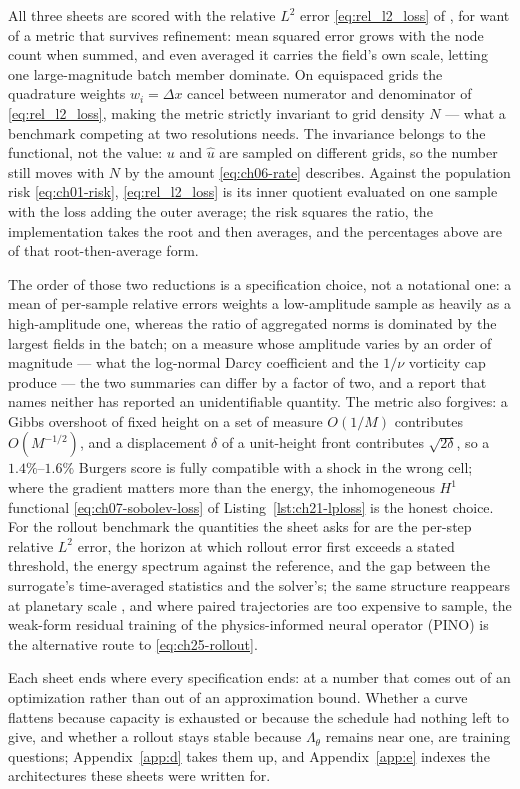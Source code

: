 All three sheets are scored with the relative $L^{2}$ error \eqref{eq:rel_l2_loss} of
, for want of a metric that
survives refinement: mean squared error grows with the node count when summed, and even
averaged it carries the field's own scale, letting one large-magnitude batch member
dominate. On equispaced grids the quadrature weights $w_i = \Delta x$ cancel
between numerator and denominator of \eqref{eq:rel_l2_loss}, making the metric strictly
invariant to grid density $N$ --- what a benchmark competing at two resolutions needs. The
invariance belongs to the functional, not the value: $u$ and $\hat{u}$ are sampled on
different grids, so the number still moves with $N$ by the amount
\eqref{eq:ch06-rate} describes. Against the population risk \eqref{eq:ch01-risk},
\eqref{eq:rel_l2_loss} is its inner quotient evaluated on one sample with the loss adding
the outer average; the risk squares the ratio, the implementation takes the root and then
averages, and the percentages above are of that root-then-average form.

The order of those two reductions is a specification choice, not a notational one: a mean
of per-sample relative errors weights a low-amplitude sample as heavily as a high-amplitude
one, whereas the ratio of aggregated norms is dominated by the largest fields in the batch;
on a measure whose amplitude varies by an order of magnitude --- what the log-normal Darcy
coefficient and the $1/\nu$ vorticity cap produce --- the two summaries can differ by a factor
of two, and a report that names neither has reported an unidentifiable quantity. The metric
also forgives: a Gibbs overshoot of fixed height on a set of measure $O(1/M)$ contributes
$O(M^{-1/2})$, and a displacement $\delta$ of a unit-height front contributes $\sqrt{2\delta}$, so a
$1.4\%$--$1.6\%$ Burgers score is fully compatible with a shock in the wrong cell; where the
gradient matters more than the energy, the inhomogeneous $H^{1}$ functional
\eqref{eq:ch07-sobolev-loss} of Listing~\ref{lst:ch21-lploss} is the honest choice. For the
rollout benchmark the quantities the sheet asks for are the per-step relative $L^{2}$
error, the horizon at which rollout error first exceeds a stated threshold, the energy
spectrum against the
reference, and the gap between the surrogate's time-averaged statistics and the solver's;
the same structure reappears at planetary scale \cite{pathak2022fourcastnet}, and where
paired trajectories are too expensive to sample, the weak-form residual training of the
physics-informed neural operator (PINO) \cite{li2021physics} is the alternative route to
\eqref{eq:ch25-rollout}.

\bigskip
\noindent Each sheet ends where every specification ends: at a number that comes out of
an optimization rather than out of an approximation bound. Whether a curve flattens
because capacity is exhausted or because the schedule had nothing left to give, and
whether a rollout stays stable because $\Lambda_{\theta}$ remains near one, are training
questions; Appendix~\ref{app:d} takes them up, and Appendix~\ref{app:e} indexes the
architectures these sheets were written for.
